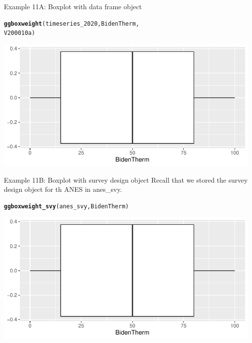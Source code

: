 \documentclass{beamer}\usepackage[]{graphicx}\usepackage[]{xcolor}
\makeatletter
\newcommand{\hlstd}[1]{\textcolor[rgb]{0.345,0.345,0.345}{#1}}%
\newcommand{\hlkwd}[1]{\textcolor[rgb]{0.737,0.353,0.396}{\textbf{#1}}}%
\newenvironment{kframe}{%
 \def\at@end@of@kframe{}%
 \ifinner\ifhmode%
  \def\at@end@of@kframe{\end{minipage}}%
  \begin{minipage}{\columnwidth}%
 \fi\fi%
 \def\FrameCommand##1{\hskip\@totalleftmargin \hskip-\fboxsep
 \colorbox{shadecolor}{##1}\hskip-\fboxsep
     \hskip-\linewidth \hskip-\@totalleftmargin \hskip\columnwidth}%
 \MakeFramed {\advance\hsize-\width
   \@totalleftmargin\z@ \linewidth\hsize
   \@setminipage}}%
 {\par\unskip\endMakeFramed%
 \at@end@of@kframe}
\newenvironment{knitrout}{}{} %
\makeatother
\begin{document}
\begin{frame}[fragile]{Example 11A: Boxplot with data frame object}
\begin{knitrout}
\color{fgcolor}\begin{kframe}
\begin{alltt}
\hlkwd{ggboxweight}\hlstd{(timeseries_2020, BidenTherm,}
    \hlstd{V200010a)}
\end{alltt}
\end{kframe}
\includegraphics[width=0.95\linewidth]{figure/unnamed-chunk-64-1} 
\end{knitrout}

\end{frame}

\begin{frame}[fragile]{Example 11B: Boxplot with survey design object}
Recall that we stored the survey design object for th ANES in anes\_svy.
\begin{knitrout}
\color{fgcolor}\begin{kframe}
\begin{alltt}
\hlkwd{ggboxweight_svy}\hlstd{(anes_svy, BidenTherm)}
\end{alltt}
\end{kframe}
\includegraphics[width=0.95\linewidth]{figure/unnamed-chunk-65-1} 
\end{knitrout}

\end{frame}
\end{document}
